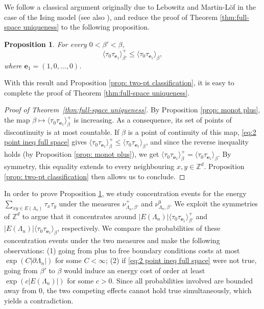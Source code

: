\documentclass[11pt,a4paper]{article}
\numberwithin{equation}{section}
\theoremstyle{plain}
\newtheorem{Prop}[Thm]{Proposition}
\theoremstyle{definition}
\begin{document}
We follow a classical argument originally due to Lebowitz and Martin-Löf in the case of the Ising model \cite{lebowitz1972uniqueness} (see also \cite[Theorem~1.12]{DuminilLecturesOnIsingandPottsModels2019}), and reduce the proof of Theorem \ref{thm:full-space uniqueness} to the following proposition.
\begin{Prop}\label{prop: key prop uniqueness full space} For every $0<\beta'<\beta$,
\begin{equation}\label{eq:2 point ineq full space}
\langle \tau_0 \tau_{\mathbf{e}_1} \rangle^+_{\beta'}\leq \langle \tau_0 \tau_{\mathbf{e}_1} \rangle_{\beta},
\end{equation}
where $\mathbf{e}_1=(1,0,\ldots,0)$.
\end{Prop}
With this result and Proposition \ref{prop: two-pt classification}, it is easy to complete the proof of Theorem \ref{thm:full-space uniqueness}.
\begin{proof}[Proof of Theorem~\textup{\ref{thm:full-space uniqueness}}] By Proposition \ref{prop: monot plus}, the map $\beta\mapsto \langle \tau_0 \tau_{\mathbf{e}_1} \rangle^+_{\beta}$ is increasing. As a consequence, its set of points of discontinuity is at most countable. If $\beta$ is a point of continuity of this map, \eqref{eq:2 point ineq full space} gives $\langle \tau_0 \tau_{\mathbf{e}_1} \rangle^+_{\beta}\leq \langle \tau_0 \tau_{\mathbf{e}_1} \rangle_{\beta}$, and since the reverse inequality holds (by Proposition \ref{prop: monot plus}), we get $\langle \tau_0 \tau_{\mathbf{e}_1} \rangle^+_{\beta}=\langle \tau_0 \tau_{\mathbf{e}_1} \rangle_{\beta}$. By symmetry, this equality extends to every neighbouring $x,y\in \mathbb Z^d$. Proposition \ref{prop: two-pt classification} then allows us to conclude. 
\end{proof}



In order to prove Proposition \ref{prop: key prop uniqueness full space}, we study concentration events for the energy $\sum_{xy\in E(\Lambda_n)}\tau_x\tau_y$ under the measures $\nu^+_{\Lambda_n,\beta'}$ and $\nu^0_{\Lambda_n,\beta}$. We exploit the symmetries of $\mathbb Z^d$ to argue that it concentrates around $|E(\Lambda_n)|\langle \tau_0\tau_{\mathbf{e}_1}\rangle_{\beta'}^+$ and $|E(\Lambda_n)|\langle\tau_0\tau_{\mathbf{e}_1}\rangle_{\beta}$, respectively. We compare the probabilities of these concentration events under the two measures and make the following observations: (1) going from plus to free boundary conditions costs at most $\exp(C|\partial \Lambda_n|)$ for some $C<\infty$; (2) if \eqref{eq:2 point ineq full space} were not true, going from $\beta'$ to $\beta$ would induce an energy cost of order at least $\exp(c|E(\Lambda_n)|)$ for some $c>0$.  Since all probabilities involved are bounded away from $0$, the two competing effects cannot hold true simultaneously, which yields a contradiction. 
\end{document}
